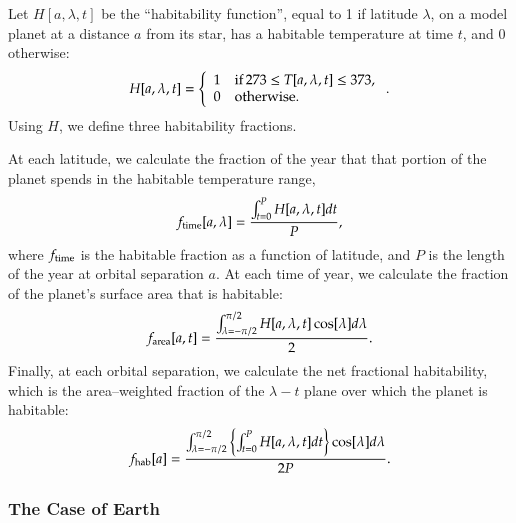 Let $H[a,\lambda,t]$ be the ``habitability function'', equal to 1 if
latitude $\lambda$, on a model planet at a distance $a$ from its star,
has a habitable temperature at time $t$, and 0 otherwise:
\begin{equation}
H[a,\lambda,t] = \left\{ \begin{array}{ll}
1 & {\rm if}\, 273 \leq T[a,\lambda,t] \leq 373, \\
0 & {\rm otherwise.}
\end{array} \right. .
\label{eq:hab_func}
\end{equation}
Using $H$, we define three habitability fractions.

At each latitude, we calculate the fraction of the year that that
portion of the planet spends in the habitable temperature range,
\begin{equation}
\label{eq:f_time}f_{\rm time}[a,\lambda] = \frac{\int_{t=0}^{P}H[a,\lambda,t] dt}{P},
\end{equation}
where $f_{\rm time}$ is the habitable fraction as a function of
latitude, and $P$ is the length of the year at orbital separation $a$.
At each time of year, we calculate the fraction of the planet's
surface area that is habitable:
\begin{equation}
\label{eq:f_lat}f_{\rm area}[a,t] = \frac{\int_{\lambda=-\pi/2}^{\pi/2}H[a,\lambda,t] \cos[\lambda] d\lambda}{2}.
\end{equation}
Finally, at each orbital separation, we calculate the net fractional
habitability, which is the area--weighted fraction of the $\lambda-t$
plane over which the planet is habitable:
\begin{equation}
\label{eq:f_hab}f_{\rm hab}[a] = \frac{\int_{\lambda=-\pi/2}^{\pi/2} \left\{ \int_{t=0}^{P}H[a,\lambda,t] dt \right\} \cos[\lambda] d\lambda }{2 P}.
\end{equation}


\subsubsection{The Case of Earth}
\label{hab_sssec:comp}

